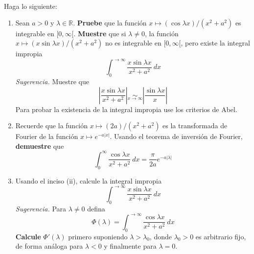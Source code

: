 \documentclass[12pt]{report}
\theoremstyle{largebreak}
\newcommand\abs[1]{\ensuremath{\left|#1\right|}}
\begin{document}
    \begin{excer}
        Haga lo siguiente:
        \begin{enumerate}
            \item Sean $a>0$ y $\lambda\in\mathbb{R}$. \textbf{Pruebe} que la función $x\mapsto (\cos \lambda x)/(x^2+a^2)$ es integrable en $[0,\infty[$. \textbf{Muestre} que si $\lambda\neq0$, la función $x\mapsto (x\sin \lambda x)/(x^2+a^2)$ no es integrable en $[0,\infty[$, pero existe la integral impropia
            \begin{equation*}
                \int_0^{\rightarrow\infty}\frac{x\sin\lambda x}{x^2+a^2}\:dx
            \end{equation*}
            \textit{Sugerencia.} Muestre que
            \begin{equation*}
                \abs{\frac{x\sin\lambda x}{x^2+a^2}}\underset{x\rightarrow\infty}{\sim}\abs{\frac{\sin\lambda x}{x}}
            \end{equation*}
            Para probar la existencia de la integral impropia use los criterios de Abel.
            \item Recuerde que la función $x\mapsto (2a)/(x^2+a^2)$ es la transformada de Fourier de la función $x\mapsto e^{-a\abs{x}}$. Usando el teorema de inversión de Fourier, \textbf{demuestre} que
            \begin{equation*}
                \int_0^{\infty}\frac{\cos\lambda x}{x^2+a^2}\:dx=\frac{\pi}{2a}e^{ -a\abs{\lambda}}
            \end{equation*}
            \item Usando el inciso (ii), calcule la integral impropia
            \begin{equation*}
                \int_0^{\rightarrow\infty}\frac{x\sin\lambda x}{x^2+a^2}\:dx
            \end{equation*}
            \textit{Sugerencia.} Para $\lambda\neq0$ defina
            \begin{equation*}
                \Phi(\lambda)=\int_0^{\rightarrow\infty}\frac{\cos\lambda x}{x^2+a^2}\:dx
            \end{equation*}
            \textbf{Calcule} $\Phi'(\lambda)$ primero suponiendo $\lambda>\lambda_0$, donde $\lambda_0>0$ es arbitrario fijo, de forma análoga para $\lambda<0$ y finalmente para $\lambda=0$.
        \end{enumerate}
    \end{excer}
\end{document}
